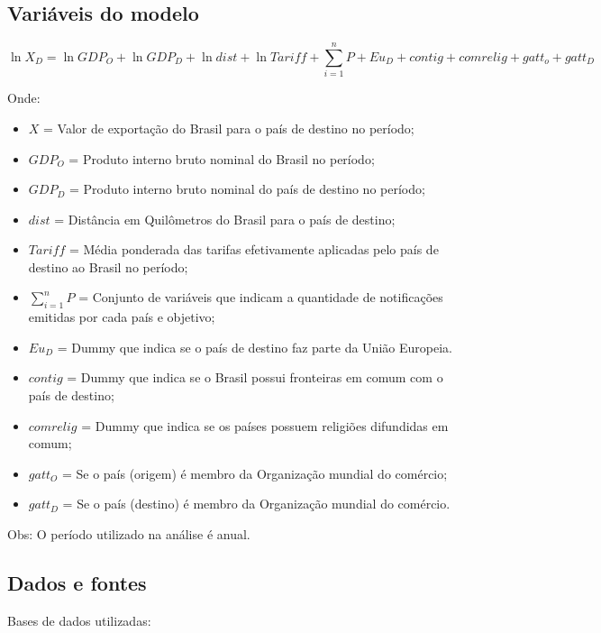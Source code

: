 \documentclass[12pt, a4paper]{article}
\begin{document}
\subsection{Variáveis do modelo}

\begin{equation}
    \ln X_{D} = 
    \ln GDP_{O} 
    + \ln GDP_{D} 
    + \ln dist 
    + \ln Tariff 
    + \sum_{i=1}^{n} P 
    + Eu_{D} 
    + contig 
    + comrelig
    + gatt_o 
    + gatt_D
\end{equation}

Onde:

\begin{itemize}
    \item $X$ = Valor de exportação do Brasil para o país de destino no período;
    \item $GDP_{O}$ = Produto interno bruto nominal do Brasil no período;
    \item $GDP_{D}$ = Produto interno bruto nominal do país de destino no período;
    \item $dist$ = Distância em Quilômetros  do Brasil para o país de destino;
    \item $Tariff$ = Média ponderada das tarifas efetivamente aplicadas pelo país de destino ao Brasil no período;
    \item $\sum_{i=1}^{n} P$ = Conjunto de variáveis que indicam a quantidade de notificações emitidas por cada país e objetivo;
    \item $Eu_{D}$ = Dummy que indica se o país de destino faz parte da União Europeia.
    \item $contig$ = Dummy que indica se o Brasil possui fronteiras em comum com o país de destino;
    \item $comrelig$ = Dummy que indica se os países possuem religiões difundidas em comum;
    \item $gatt_O$ = Se o país (origem) é membro da Organização mundial do comércio;
    \item $gatt_D$ = Se o país (destino) é membro da Organização mundial do comércio.
\end{itemize}

Obs: O período utilizado na análise é anual.

\subsection{Dados e fontes}

Bases de dados utilizadas:
\end{document}
